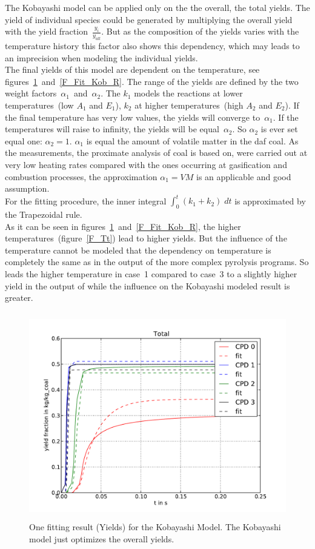 The Kobayashi model can be applied only on the the overall, the total yields. The yield of individual species could be generated by multiplying the overall yield with the yield fraction~$\frac{y_i}{y_{all}}$. But as the composition of the yields varies with the temperature history this factor also shows this dependency, which may leads to an imprecision when modeling the individual yields.\\
The final yields of this model are dependent on the temperature, see figures~\ref{F_Fit_Kob_Y}~and~\ref{F_Fit_Kob_R}. The range of the yields are defined by the two weight factors~$\alpha_1$~and~$\alpha_2$. The $k_1$ models the reactions at lower temperatures~(low $A_1$ and $E_1$), $k_2$ at higher temperatures~(high $A_2$ and $E_2$). If the final temperature has very low values, the yields will converge to~$\alpha_1$. If the temperatures will raise to infinity, the yields will be equal~$\alpha_2$. So $\alpha_2$ is ever set equal one: $\alpha_2=1$. $\alpha_1$ is equal the amount of volatile matter in the daf coal. As the measurements, the proximate analysis of coal is based on, were carried out at very low heating rates compared with the ones occurring at gasification and combustion processes, the approximation $\alpha_1=VM$ is an applicable and good assumption.\\

For the fitting procedure, the inner integral $\int_{0}^{t} ( k_1 + k_2 ) \; dt$ is approximated by the Trapezoidal rule.\\

As it can be seen in figures~\ref{F_Fit_Kob_Y}~and~\ref{F_Fit_Kob_R}, the higher temperatures~(figure~\ref{F_Tt}) lead to higher yields. But the influence of the temperature cannot be modeled that the dependency on temperature is completely the same as in the output of the more complex pyrolysis programs. So leads the higher temperature in case~1 compared to case~3 to a slightly higher yield in the output of \CPD while the influence on the Kobayashi modeled result is greater.

\begin{figure}
\centering%
\includegraphics[height=9cm,angle=0]{Figures/CPD-Fit_result_Kob_Total_Y}
\caption{One fitting result (Yields) for the Kobayashi Model. The Kobayashi model just optimizes the overall yields.}
\label{F_Fit_Kob_Y}
\end{figure}

